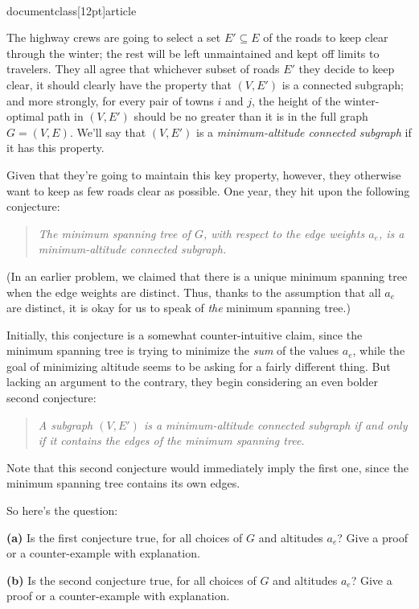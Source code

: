 \\documentclass[12pt]{article}
\def\gap{0.2in}
\begin{document}
\begin{enumerate}
The highway crews are going to select a set $E' \subseteq E$
of the roads to keep clear through the winter;
the rest will be left unmaintained and kept off limits to travelers.
They all agree that whichever subset of roads $E'$
they decide to keep clear, it should clearly have the property
that $(V,E')$ is a connected subgraph;
and more strongly,
for every pair of towns $i$ and $j$, the
height of the winter-optimal path in $(V,E')$
should be no greater than it is in the full graph $G = (V,E)$.
We'll say that $(V,E')$ is a
{\em minimum-altitude connected subgraph}
if it has this property.

Given that they're going to maintain this key property, however,
they otherwise want to keep as few roads clear as possible.
One year, they hit upon the following conjecture:
\begin{quote}
{\em The minimum spanning tree of $G$, with respect
to the edge weights $a_e$, is a
minimum-altitude connected subgraph.}
\end{quote}
(In an earlier problem, we claimed that there is a unique
minimum spanning tree when the edge weights are distinct.
Thus, thanks to the assumption that all $a_e$ are distinct, it is okay for
us to speak of {\em the} minimum spanning tree.)

Initially, this conjecture is a somewhat counter-intuitive claim,
since the minimum spanning tree is trying to minimize
the {\em sum} of the values $a_e$,
while the goal of minimizing altitude seems to
be asking for a fairly different thing.
But lacking an argument to the contrary,
they begin considering an even bolder second conjecture:
\begin{quote}
{\em A subgraph $(V,E')$ is a
minimum-altitude connected subgraph if and only if
it contains the edges of the minimum spanning tree.}
\end{quote}
Note that this second conjecture would immediately
imply the first one, since the minimum spanning tree
contains its own edges.

So here's the question:

\vskip \gap
{\bf (a)} Is the first conjecture true, for all choices
of $G$ and altitudes $a_e$?
Give a proof or a counter-example with explanation.

\vskip \gap
{\bf (b)} Is the second conjecture true, for all choices
of $G$ and altitudes $a_e$?
Give a proof or a counter-example with explanation.


\end{enumerate}
\end{document}
